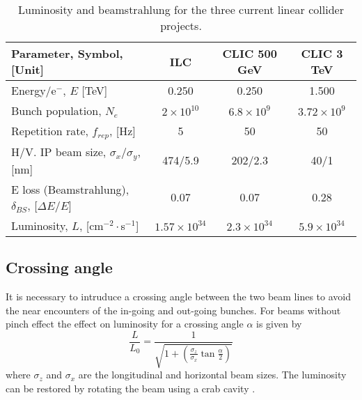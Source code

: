 \begin{table}[h]
{%
\centering
\begin{tabular}{l||c|c|c}\hline
Parameter, Symbol, [Unit]& ILC & CLIC 500 GeV& CLIC 3 TeV\\\hline\hline
Energy/e$^-$, $E$ [TeV]& 0.250 & 0.250 & 1.500\\
Bunch population, $N_e$ &$2\times10^{10}$&$6.8\times10^9$&$3.72\times10^9$\\
Repetition rate, $f_{rep}$, [Hz]&5 &50&50\\
H/V. IP beam size, $\sigma_x/\sigma_y$, [nm] &474/5.9&202/2.3&40/1\\\hline
E loss (Beamstrahlung), $\delta_{BS}$, [$\Delta E/E$]&0.07&0.07&0.28\\
Luminosity, $L$, [cm$^{-2}\cdot$s$^{-1}$]&$1.57\times10^{34}$ & $2.3\times10^{34}$&$5.9\times10^{34}$\\\hline
\end{tabular}\caption{Luminosity and beamstrahlung for the three current linear collider projects.}\label{t:beam_rad}
}
\end{table}
\subsection{Crossing angle}
It is necessary to intruduce a crossing angle between the two beam lines to avoid the near encounters of the in-going and out-going bunches. For beams without pinch effect the effect on luminosity for a crossing angle $\alpha$ is given by \cite{Napoly:240071}
\begin{equation}
 \frac{L}{L_0}=\frac{1}{\sqrt{1+\left(\frac{\sigma_z}{\sigma_x}\tan\frac{\alpha}{2}\right)}}
\end{equation}
where $\sigma_z$ and $\sigma_x$ are the longitudinal and horizontal beam sizes. The luminosity can be restored by rotating the beam using a crab cavity \cite{PhysRevSTAB.16.041001}.
